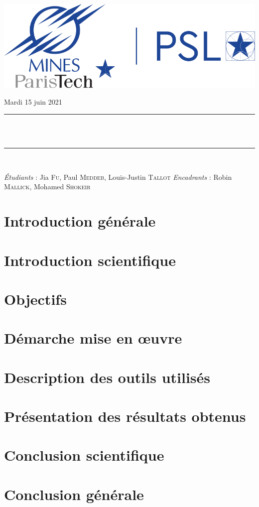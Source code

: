 \documentclass[12pt,oneside,oldfontcommands]{memoir}
\makeatletter
\def\maketitle{%
  \null
  \thispagestyle{empty}
  \begin{center}\leavevmode
       \vskip 2cm
       \normalfont
       \includegraphics[width=0.5\columnwidth]{logo_mines.png}
       \vskip 1cm
	     {\large Mardi 15 juin 2021\par}
       \vskip 1.0cm
	\rule{\linewidth}{0.2 mm} \\[0.4 cm]
	{ \huge \bfseries \@title}\\
	\rule{\linewidth}{0.2 mm} \\[1.5 cm]
	
	\vspace{1cm}
	
	\Large{\emph{Étudiants} : Jia \textsc{Fu}, Paul \textsc{Meddeb}, Louis-Justin \textsc{Tallot}}
	\vspace{0.5cm}
	\Large{\emph{Encadrants} : Robin \textsc{Mallick}, Mohamed \textsc{Shokeir}}
	
   \end{center}
   \vfill
   \null
   \cleardoublepage
  }
\makeatother
\begin{document}
\maketitle
\frontmatter
\let\cleardoublepage\clearpage
\mainmatter
\sloppy




\section*{Introduction générale}


\section*{Introduction scientifique}


\section*{Objectifs}


\section*{Démarche mise en œuvre}


\section*{Description des outils utilisés}


\section*{Présentation des résultats obtenus}


\section*{Conclusion scientifique}


\section*{Conclusion générale}

\end{document}
